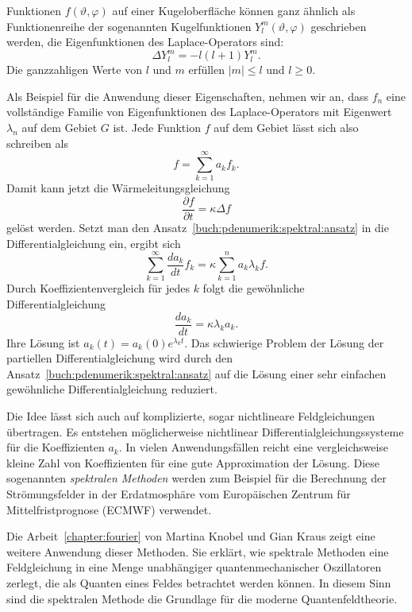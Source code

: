 Funktionen $f(\vartheta,\varphi)$ auf einer Kugeloberfläche können
ganz ähnlich als Funktionenreihe der sogenannten Kugelfunktionen
$Y^m_l(\vartheta,\varphi)$ geschrieben werden, die Eigenfunktionen
des Laplace-Operators sind:
\[
\Delta Y^m_l
=
-l(l+1) Y^m_l.
\]
Die ganzzahligen Werte von $l$ und $m$ erfüllen $|m|\le l$ und $l\ge 0$.

Als Beispiel für die Anwendung dieser Eigenschaften, nehmen wir an,
dass $f_n$ eine vollständige Familie von Eigenfunktionen des Laplace-Operators
mit Eigenwert $\lambda_n$ auf dem Gebiet $G$ ist. 
Jede Funktion $f$ auf dem Gebiet lässt sich also schreiben als
\begin{equation}
f = \sum_{k=1}^\infty a_k f_k.
\label{buch:pdenumerik:spektral:ansatz}
\end{equation}
Damit kann jetzt die Wärmeleitungsgleichung
\[
\frac{\partial f}{\partial t}
=
\kappa
\Delta f
\]
gelöst werden.
Setzt man den Ansatz~\eqref{buch:pdenumerik:spektral:ansatz} in die 
Differentialgleichung ein, ergibt sich
\[
\sum_{k=1}^\infty
\frac{d a_k}{d t}
f_k
=
\kappa \sum_{k=1}^n a_k \lambda_k f.
\]
Durch Koeffizientenvergleich für jedes $k$ folgt die gewöhnliche
Differentialgleichung
\[
\frac{d a_k}{d t}
=
\kappa \lambda_k a_k.
\]
Ihre Lösung ist $a_k(t) = a_k(0) e^{\lambda_kt}$.
Das schwierige Problem der Lösung der partiellen Differentialgleichung
wird durch den Ansatz~\eqref{buch:pdenumerik:spektral:ansatz} auf die
Lösung einer sehr einfachen gewöhnliche Differentialgleichung reduziert.

Die Idee lässt sich auch auf komplizierte, sogar nichtlineare
Feldgleichungen übertragen.
Es entstehen möglicherweise nichtlinear Differentialgleichungssysteme
für die Koeffizienten $a_k$.
In vielen Anwendungsfällen reicht eine vergleichsweise kleine Zahl
von Koeffizienten für eine gute Approximation der Lösung.
Diese sogenannten \emph{spektralen Methoden}
%
werden zum Beispiel für die Berechnung der Strömungsfelder in der 
Erdatmosphäre vom Europäischen Zentrum für Mittelfristprognose
(ECMWF) verwendet.

Die Arbeit~\ref{chapter:fourier} von Martina Knobel und Gian Kraus
zeigt eine weitere Anwendung dieser Methoden.
Sie erklärt, wie spektrale Methoden eine Feldgleichung in eine Menge
unabhängiger quantenmechanischer Oszillatoren zerlegt, die als Quanten
eines Feldes betrachtet werden können.
In diesem Sinn sind die spektralen Methode die Grundlage für die
moderne Quantenfeldtheorie.

%
%
